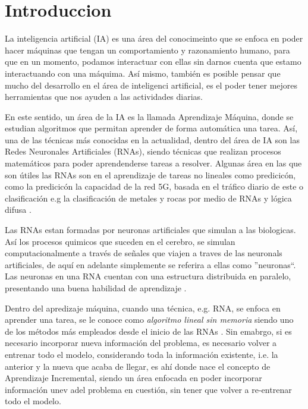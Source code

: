 \section{Introduccion}

La inteligencia artificial (IA) es una área del conocimeinto que se enfoca en poder hacer máquinas que tengan un comportamiento y razonamiento humano, para que en un momento,  podamos interactuar con ellas sin darnos cuenta que estamo interactuando con una máquima. Así mismo,  también es posible pensar que mucho del desarrollo en el área de inteligenci artificial, es el poder tener mejores herramientas que nos ayuden a las actividades diarias. 

En este sentido, un área de la IA es la llamada Aprendizaje Máquina,  donde se estudian algoritmos que permitan aprender de forma automática una tarea. Así, una de las técnicas más conocidas en la actualidad, dentro del área de IA son las Redes Neuronales Artificiales (RNAs), siendo técnicas que realizan procesos matem\'aticos para poder aprendenderse tareas a resolver.  Algunas área en las que son útiles las RNAs son en el aprendizaje de tareas no lineales como predicicón, como la predicicón la capacidad de la red 5G, basada en el tráfico diario de este \cite{zhao2022} o clasificación e.g la clasificación de metales y rocas por medio de RNAs y lógica difusa \cite{salazar2013}. 

Las RNAs estan formadas por neuronas artificiales que simulan a las biologicas. Así los procesos quimicos que suceden en el cerebro, se simulan computacionalmente a través de señales que viajen a traves de las neuronals artificiales, de aquí en adelante simplemente se referira a ellas como ''neuronas``. Las neuronas en una RNA cuentan con una estructura distribuida en paralelo, presentando una buena habilidad de aprendizaje \cite{liu2015}.

Dentro del apredizaje máquina, cuando una técnica, e.g. RNA, se enfoca en aprender una tarea, se le conoce como \textit{algoritmo lineal sin memoria} siendo uno de los métodos más empleados desde el inicio de las RNAs \cite{GiraudCarrier2000}.  Sin emabrgo, si es necesario incorporar nueva información del problema,  es necesario volver a entrenar todo el modelo, considerando toda la información existente, i.e. la anterior y la nueva que acaba de llegar, es ahí donde nace el concepto de Aprendizaje Incremental, siendo un área enfocada en poder incorporar información unev adel problema en cuestión, sin tener que volver a re-entrenar todo el modelo.


